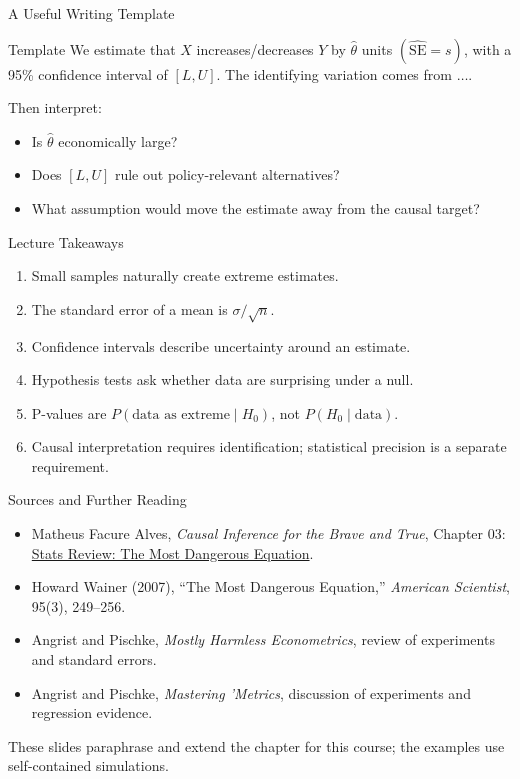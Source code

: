 \documentclass[11pt,aspectratio=169]{beamer}
\newcommand{\se}{\mathrm{SE}}
\begin{document}
\begin{frame}{A Useful Writing Template}
  \begin{block}{Template}
    We estimate that \(X\) increases/decreases \(Y\) by \(\hat{\theta}\) units
    \((\widehat{\se}=s)\), with a 95\% confidence interval of
    \([L,U]\). The identifying variation comes from \(\ldots\).
  \end{block}
  \vspace{0.4em}
  Then interpret:
  \begin{itemize}
    \item Is \(\hat{\theta}\) economically large?
    \item Does \([L,U]\) rule out policy-relevant alternatives?
    \item What assumption would move the estimate away from the causal target?
  \end{itemize}
\end{frame}

\begin{frame}{Lecture Takeaways}
  \begin{enumerate}
    \item Small samples naturally create extreme estimates.
    \item The standard error of a mean is \(\sigma/\sqrt{n}\).
    \item Confidence intervals describe uncertainty around an estimate.
    \item Hypothesis tests ask whether data are surprising under a null.
    \item P-values are \(P(\text{data as extreme}\mid H_0)\), not \(P(H_0\mid\text{data})\).
    \item Causal interpretation requires identification; statistical precision is a separate requirement.
  \end{enumerate}
\end{frame}

\begin{frame}{Sources and Further Reading}
  \begin{itemize}
    \item Matheus Facure Alves, \emph{Causal Inference for the Brave and True}, Chapter 03:
    \href{https://matheusfacure.github.io/python-causality-handbook/03-Stats-Review-The-Most-Dangerous-Equation.html}{Stats Review: The Most Dangerous Equation}.
    \item Howard Wainer (2007), ``The Most Dangerous Equation,'' \emph{American Scientist}, 95(3), 249--256.
    \item Angrist and Pischke, \emph{Mostly Harmless Econometrics}, review of experiments and standard errors.
    \item Angrist and Pischke, \emph{Mastering 'Metrics}, discussion of experiments and regression evidence.
  \end{itemize}
  \vspace{0.3em}
  These slides paraphrase and extend the chapter for this course; the examples use self-contained simulations.
\end{frame}
\end{document}
